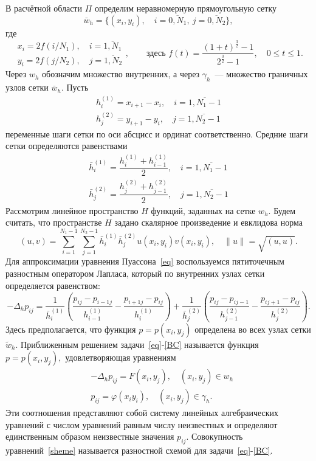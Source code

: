 \documentclass[11pt]{article}
\numberwithin{equation}{section}
\theoremstyle{plain}
\theoremstyle{definition}
\begin{document}
В расчётной области \(\Pi\) определим неравномерную прямоугольную сетку
\[\bar w_{h}=\{{(x_i,y_i),\quad i = \overline{0,N_1},\ j=\overline{0,N_2}}\},\]
где
\[\begin{aligned}
x_i = 2f(i/N_1),\quad i = \overline{1,N_1}\\
y_i = 2f(j/N_2),\quad j = \overline{1,N_2}
\end{aligned},\qquad \mbox{здесь }f(t)=\dfrac{(1+t)^{\frac{3}{2}}-1}{2^\frac{3}{2}-1},\quad 0\leqslant t\leqslant 1.
\]
Через \(w_h\) обозначим множество внутренних, а через \(\gamma_h\)~--- множество граничных узлов сетки \(\bar w_{h}.\) Пусть
\[\begin{aligned}
h_i^{(1)} = x_{i+1}-x_{i},\quad i = \overline{1,N_1-1}\\
h_j^{(2)} = y_{i+1}-y_{i},\quad j = \overline{1,N_2-1}
\end{aligned}\]
переменные шаги сетки по оси абсцисс и ординат соответственно. Средние шаги сетки определяются равенствами
\[\begin{aligned}
\bar h_i^{(1)} = \dfrac{h_{i}^{(1)}+h_{i-1}^{(1)}}{2},\quad i = \overline{1,N_1-1}\\
\bar h_j^{(2)} = \dfrac{h_{j}^{(2)}+h_{j-1}^{(2)}}{2},\quad j = \overline{1,N_2-1}
\end{aligned}\]
Рассмотрим линейное пространство \(H\) функций, заданных на сетке \(w_{h}.\) Будем считать, что  пространстве \(H\) задано скалярное произведение и евклидова норма
\[(u,v)=\sum_{i=1}^{N_1-1}\sum_{j=1}^{N_2-1}\bar h_{i}^{(1)}\bar{h}_{j}^{(2)}u(x_{i},y_{i})v(x_i,y_i),\quad\|u\|=\sqrt{(u,u)}.\]
Для аппроксимации уравнения Пуассона~\eqref{eq} воспользуемся пятиточечным разностным оператором Лапласа, который по внутренних узлах сетки определяется равенством:
\[-\Delta_h p_{ij}=\dfrac{1}{\bar{h}_i^{(1)}}\left(\dfrac{p_{ij}-p_{i-1j}}{h_{i-1}^{(1)}}-\dfrac{p_{i+1j}-p_{ij}}{h_{i}^{(1)}}\right)+\dfrac{1}{\bar{h}_{j}^{(2)}}\left(\dfrac{p_{ij}-p_{ij-1}}{h_{j-1}^{(2)}}-\dfrac{p_{ij+1}-p_{ij}}{h_{j}^{(2)}}\right).\]
Здесь предполагается, что функция \(p=p(x_{i},y_{j})\) определена во всех узлах сетки \(\tilde w_{h}.\)
Приближенным решением задачи~\eqref{eq}-\eqref{BC} называется функция \(p=p(x_{i},y_{j}),\) удовлетворяющая уравнениям
\begin{equation}
\label{sheme}
\begin{aligned}
&-\Delta_h p_{ij}=F(x_i,y_j),\quad (x_i,y_j)\in w_{h}\\
&p_{ij}=\varphi(x_{i}y_{i}),\quad (x_{i},y_{j})\in \gamma_{h}.
\end{aligned}
\end{equation}
Эти соотношения представляют собой систему линейных алгебраических уравнений с числом уравнений равным числу неизвестных и определяют единственным образом неизвестные значения \(p_{ij}.\) Совокупность уравнений~\eqref{sheme} называется разностной схемой для задачи~\eqref{eq}-\eqref{BC}.
\end{document}
